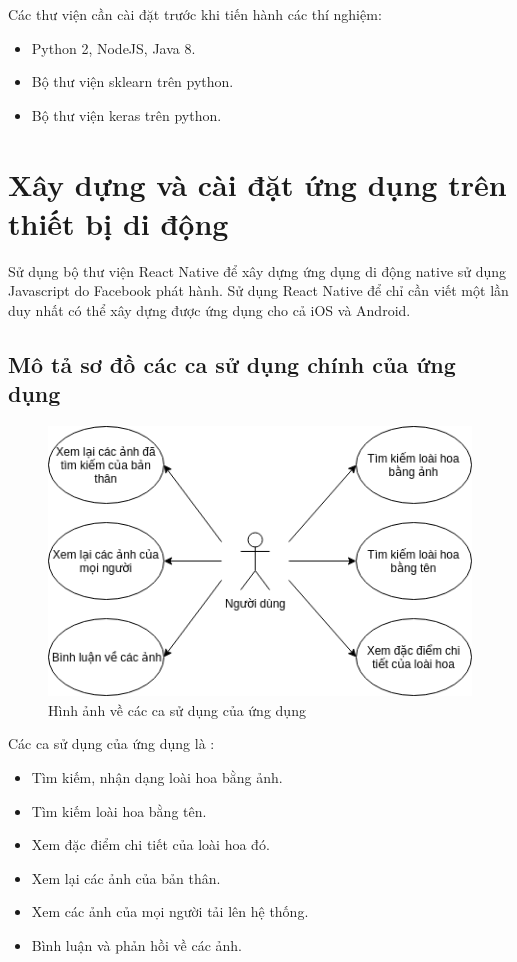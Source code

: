 \documentclass[12pt]{report}
\begin{document}
				
		Các thư viện cần cài đặt trước khi tiến hành các thí nghiệm:
				
		\begin{itemize}
			\item Python 2, NodeJS, Java 8.
			\item Bộ thư viện sklearn trên python.
			\item Bộ thư viện keras trên python.
		\end{itemize}
						
		\section{Xây dựng và cài đặt ứng dụng trên thiết bị di động}
		Sử dụng bộ thư viện React Native để xây dựng ứng dụng di động native sử dụng Javascript do Facebook phát hành. Sử dụng React Native để chỉ cần viết một lần duy nhất có thể xây dựng được ứng dụng cho cả iOS và Android.
		\subsection{Mô tả sơ đồ các ca sử dụng chính của ứng dụng}
						
		\begin{figure}[h]
			\centering
			\includegraphics[scale=1]{usecase}
			\caption{Hình ảnh về các ca sử dụng của ứng dụng}
			\label{fig:usecase}
		\end{figure}
		Các ca sử dụng của ứng dụng là :
				
		\begin{itemize}
			\item Tìm kiếm, nhận dạng loài hoa bằng ảnh.
			\item Tìm kiếm loài hoa bằng tên.
			\item Xem đặc điểm chi tiết của loài hoa đó.
			\item Xem lại các ảnh của bản thân.
			\item Xem các ảnh của mọi người tải lên hệ thống.
			\item Bình luận và phản hồi về các ảnh.
		\end{itemize}
				
\end{document}
